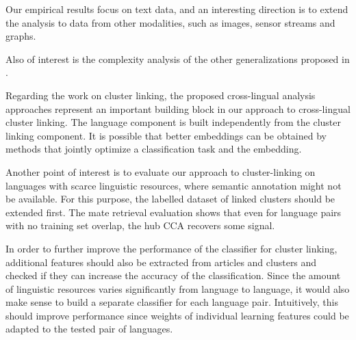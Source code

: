 Our empirical results focus on text data, and an interesting direction is to extend the analysis to
data from other modalities, such as images, sensor streams and graphs.

Also of interest is the complexity analysis of the other generalizations proposed in \cite{Kettenring}.

Regarding the work on cluster linking, the proposed cross-lingual analysis approaches represent an important building block in our
approach to cross-lingual cluster linking. The language component is
built independently from the cluster linking component.
It is possible that better embeddings can be obtained by methods that
jointly optimize a classification task and the embedding.

Another point of interest is to evaluate our approach to cluster-linking on languages with scarce
linguistic resources, where semantic annotation might not be available. For this purpose,
the labelled dataset of linked clusters should be extended first. The mate retrieval evaluation
shows that even for language pairs with no training set overlap, the hub CCA recovers some signal.

In order to further improve the performance of the classifier for cluster linking, additional features should also
be extracted from articles and clusters and checked if they can increase the accuracy of the classification.
Since the amount of linguistic resources varies significantly from language to language, it would also make sense
to build a separate classifier for each language pair. Intuitively, this should improve performance since weights
of individual learning features could be adapted to the tested pair of languages.
